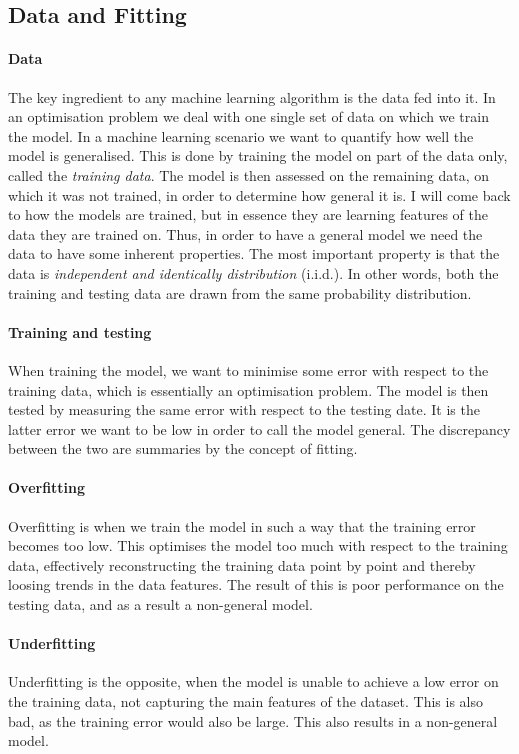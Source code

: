     \subsection{Data and Fitting}
        \paragraph{Data}
        The key ingredient to any machine learning algorithm is the data fed into it. In an optimisation problem we deal with one single set of data on which we train the model. In a machine learning scenario we want to quantify how well the model is generalised. This is done by training the model on part of the data only, called the \textit{training data}. The model is then assessed on the remaining data, on which it was not trained, in order to determine how general it is. I will come back to how the models are trained, but in essence they are learning features of the data they are trained on. Thus, in order to have a general model we need the data to have some inherent properties. The most important property is that the data is \textit{independent and identically distribution} (i.i.d.). In other words, both the training and testing data are drawn from the same probability distribution.

        \paragraph{Training and testing}
        When training the model, we want to minimise some error with respect to the training data, which is essentially an optimisation problem. The model is then tested by measuring the same error with respect to the testing date. It is the latter error we want to be low in order to call the model general. The discrepancy between the two are summaries by the concept of fitting. 

        \paragraph{Overfitting}
        Overfitting is when we train the model in such a way that the training error becomes too low. This optimises the model too much with respect to the training data, effectively reconstructing the training data point by point and thereby loosing trends in the data features. The result of this is poor performance on the testing data, and as a result a non-general model. 

        \paragraph{Underfitting}
        Underfitting is the opposite, when the model is unable to achieve a low error on the training data, not capturing the main features of the dataset. This is also bad, as the training error would also be large. This also results in a non-general model. 

